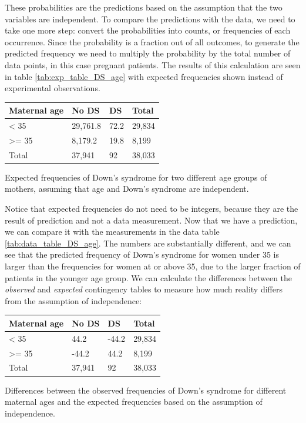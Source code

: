 \documentclass[
  letterpaper,
  DIV=11,
  numbers=noendperiod]{scrreprt}
\begin{document}
These probabilities are the predictions based on the assumption that the
two variables are independent. To compare the predictions with the data,
we need to take one more step: convert the probabilities into counts, or
frequencies of each occurrence. Since the probability is a fraction out
of all outcomes, to generate the predicted frequency we need to multiply
the probability by the total number of data points, in this case
pregnant patients. The results of this calculation are seen in table
\ref{tab:exp_table_DS_age} with expected frequencies shown instead of
experimental observations.

\begin{longtable}[]{@{}llll@{}}
\toprule()
Maternal age & No DS & DS & Total \\
\midrule()
\endhead
\textless{} 35 & 29,761.8 & 72.2 & 29,834 \\
\textgreater= 35 & 8,179.2 & 19.8 & 8,199 \\
Total & 37,941 & 92 & 38,033 \\
\bottomrule()
\end{longtable}

Expected frequencies of Down's syndrome for two different age groups of
mothers, assuming that age and Down's syndrome are independent.

Notice that expected frequencies do not need to be integers, because
they are the result of prediction and not a data measurement. Now that
we have a prediction, we can compare it with the measurements in the
data table \ref{tab:data_table_DS_age}. The numbers are substantially
different, and we can see that the predicted frequency of Down's
syndrome for women under 35 is larger than the frequencies for women at
or above 35, due to the larger fraction of patients in the younger age
group. We can calculate the differences between the \emph{observed} and
\emph{expected} contingency tables to measure how much reality differs
from the assumption of independence:

\begin{longtable}[]{@{}llll@{}}
\toprule()
Maternal age & No DS & DS & Total \\
\midrule()
\endhead
\textless{} 35 & 44.2 & -44.2 & 29,834 \\
\textgreater= 35 & -44.2 & 44.2 & 8,199 \\
Total & 37,941 & 92 & 38,033 \\
\bottomrule()
\end{longtable}

Differences between the observed frequencies of Down's syndrome for
different maternal ages and the expected frequencies based on the
assumption of independence.
\end{document}
